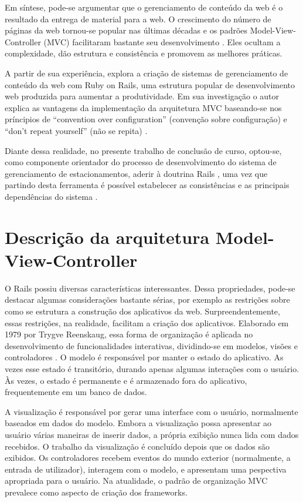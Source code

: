 Em síntese, pode-se argumentar que o gerenciamento de conteúdo da web é o resultado da entrega de material para a web. O crescimento do número de páginas da web tornou-se popular nas últimas décadas  e os padrões Model-View-Controller (MVC) facilitaram bastante seu desenvolvimento \cite{mckeever2003understanding}. Eles ocultam a complexidade, dão estrutura e consistência e promovem as melhores práticas.

A partir de sua experiência, \cite{tapiador2012content}  explora a criação de sistemas de gerenciamento de conteúdo da web com
Ruby on Rails, uma estrutura popular de desenvolvimento web produzida para aumentar a produtividade. Em sua investigação o autor explica as vantagens da implementação
da arquitetura MVC baseando-se nos príncipios de “convention over configuration” (convenção sobre configuração) e “don’t repeat yourself” (não se repita) \cite{bachle2007ruby}.

Diante dessa realidade, no presente trabalho de conclusão de curso, optou-se, como componente orientador do processo de desenvolvimento do sistema de gerenciamento de estacionamentos, aderir à doutrina Rails \cite{taylor2010rails}, uma vez que partindo desta ferramenta é possível estabelecer as consistências e as principais
dependências do sistema \cite{astels2002extreme}.

\section{Descrição da arquitetura Model-View-Controller}

O Rails possiu diversas características interessantes. Dessa propriedades, pode-se destacar algumas considerações bastante sérias, por exemplo as restrições sobre como se estrutura a construção dos aplicativos da web. Surpreendentemente, essas restrições, na realidade, facilitam a criação dos aplicativos.
Elaborado em 1979 por Trygve Reenskaug, essa forma de organização é aplicada no desenvolvimento de funcionalidades interativas, dividindo-se em modelos, visões e controladores \cite{ruby2009agile}. 
O modelo é responsável por manter o estado do aplicativo. As vezes
esse estado é transitório, durando apenas algumas interações com o usuário. Às vezes, o estado é permanente e é armazenado fora do aplicativo, frequentemente em um banco de dados.


A visualização é responsável por gerar uma interface com o usuário, normalmente baseados em dados do modelo. Embora a visualização possa apresentar ao usuário
várias maneiras de inserir dados, a própria exibição nunca lida com dados recebidos.
O trabalho da visualização é concluído depois que os dados são exibidos. 
Os controladores recebem eventos do
mundo exterior (normalmente, a entrada de utilizador), interagem com o modelo, e apresentam uma pespectiva apropriada para o usuário.
Na atualidade, o padrão de organização MVC prevalece como aspecto de criação dos frameworks. 


